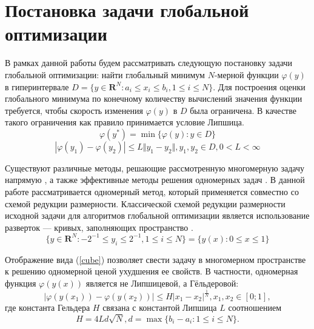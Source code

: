 \documentclass{cmi}
\begin{document}
\section{Постановка задачи глобальной оптимизации}
В рамках данной работы будем рассматривать следующую постановку задачи глобальной
оптимизации: найти глобальный минимум \(N\)-мерной функции \(\varphi(y)\) в гиперинтервале
\(D=\{y\in \mathbf{R}^N:a_i\leqslant x_i\leqslant{b_i}, 1\leqslant{i}\leqslant{N}\}\).
Для построения оценки глобального минимума по конечному количеству вычислений
значения функции требуется, чтобы скорость изменения \(\varphi(y)\) в \(D\) была ограничена.
В качестве такого ограничения как правило принимается условие Липшица.
\begin{equation}
\label{eq:task}
\varphi(y^*)=\min\{\varphi(y):y\in D\}
\end{equation}
\begin{displaymath}
\label{lip}
|\varphi(y_1)-\varphi(y_2)|\leqslant L\Vert y_1-y_2\Vert,y_1,y_2\in D,0<L<\infty
\end{displaymath}

Существуют различные методы, решающие рассмотренную многомерную задачу напрямую \cite{SergeyevKvasov2017, Jones2009},
а также эффективные методы решения одномерных задач \cite{Norkin1992, Strongin2000}. В данной работе рассматривается одномерный метод,
который применяется совместно со схемой редукции размерности.
Классической схемой редукции размерности исходной задачи для алгоритмов глобальной оптимизации является
использование разверток --- кривых, заполняющих пространство \cite{Sergeyev2013}.
\begin{equation}
\label{cube}
\lbrace y\in \mathbf{R}^N:-2^{-1}\leqslant y_i\leqslant 2^{-1},1\leqslant i\leqslant N\rbrace=\{y(x):0\leqslant x\leqslant 1\}
\end{equation}

Отображение вида (\ref{cube}) позволяет свести задачу в многомерном пространстве к решению
одномерной ценой ухудшения ее свойств. В частности, одномерная функция \(\varphi(y(x))\)
является не Липшицевой, а Гёльдеровой:
\begin{displaymath}
\label{holder}
|\varphi(y(x_1))-\varphi(y(x_2))|\leqslant H{|x_1-x_2|}^{\frac{1}{N}},x_1,x_2\in[0;1],
\end{displaymath}
где константа Гельдера \(H\) связана с константой Липшица \(L\) соотношением
\begin{displaymath}
H=4Ld\sqrt{N},d=\max\{b_i-a_i:1\leqslant i\leqslant N\}.
\end{displaymath}
\end{document}
